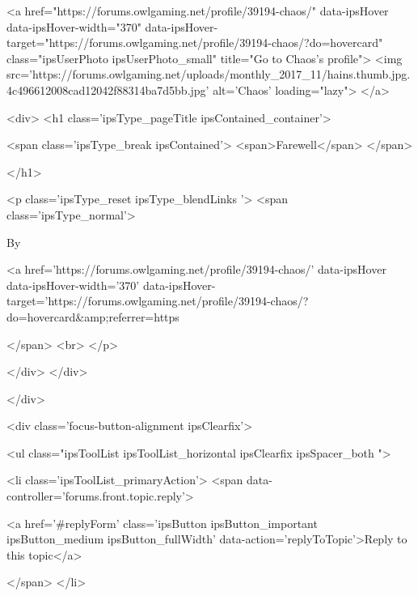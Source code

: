 	<a href="https://forums.owlgaming.net/profile/39194-chaos/" data-ipsHover data-ipsHover-width="370" data-ipsHover-target="https://forums.owlgaming.net/profile/39194-chaos/?do=hovercard" class="ipsUserPhoto ipsUserPhoto_small" title="Go to Chaos's profile">
		<img src='https://forums.owlgaming.net/uploads/monthly_2017_11/hains.thumb.jpg.4c496612008cad12042f88314ba7d5bb.jpg' alt='Chaos' loading="lazy">
	</a>

		<div>
			<h1 class='ipsType_pageTitle ipsContained_container'>
				

				
				
					<span class='ipsType_break ipsContained'>
						<span>Farewell</span>
					</span>
				
			</h1>
			
			<p class='ipsType_reset ipsType_blendLinks '>
				<span class='ipsType_normal'>
				
					By 


<a href='https://forums.owlgaming.net/profile/39194-chaos/' data-ipsHover data-ipsHover-width='370' data-ipsHover-target='https://forums.owlgaming.net/profile/39194-chaos/?do=hovercard&amp;referrer=https%
				
				</span>
				<br>
			</p>
			
		</div>
	</div>



</div>






<div class='focus-button-alignment ipsClearfix'>

	
	
	<ul class="ipsToolList ipsToolList_horizontal ipsClearfix ipsSpacer_both ">
		
			<li class='ipsToolList_primaryAction'>
				<span data-controller='forums.front.topic.reply'>
					
						<a href='#replyForm' class='ipsButton ipsButton_important ipsButton_medium ipsButton_fullWidth' data-action='replyToTopic'>Reply to this topic</a>
					
				</span>
			</li>
		
		
		
